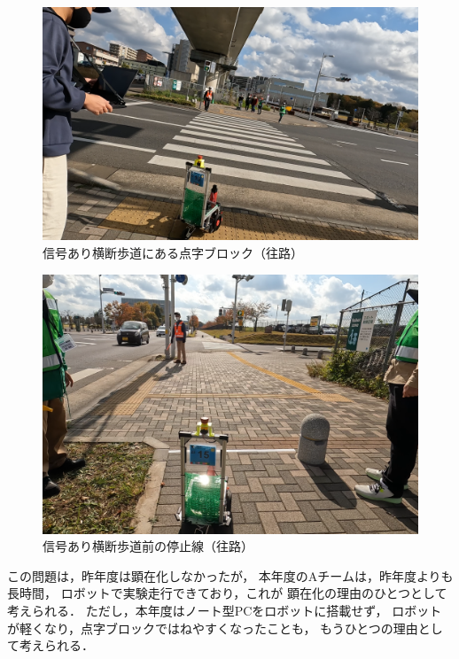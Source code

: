 \documentclass[twocolumn,9pt]{jsproceedings}
\begin{document}
\begin{figure}[h]
  \begin{center}
    \includegraphics[width=1.0\linewidth]{figs/stop_second_stop_position.pdf}
	  \caption{信号あり横断歩道にある点字ブロック（往路）}
    \label{fig:stop_second_stop_position}
  \end{center}
\end{figure}

\begin{figure}[h]
  \begin{center}
    \includegraphics[width=1.0\linewidth]{figs/stop_first_stop_position.pdf}
	  \caption{信号あり横断歩道前の停止線（往路）}
    \label{fig:stop_first_stop_position}
  \end{center}
\end{figure}

この問題は，昨年度は顕在化しなかったが，
本年度のAチームは，昨年度よりも長時間，
ロボットで実験走行できており，これが
顕在化の理由のひとつとして考えられる．
ただし，本年度はノート型PCをロボットに搭載せず，
ロボットが軽くなり，点字ブロックではねやすくなったことも，
もうひとつの理由として考えられる．
\end{document}
